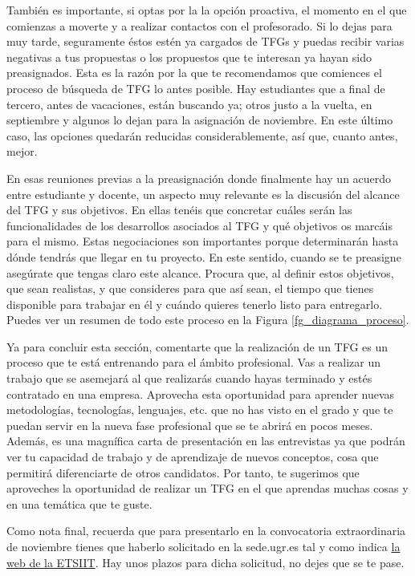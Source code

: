 También es importante, si optas por la la opción proactiva, el momento en el que comienzas a moverte y a realizar contactos con el profesorado. Si lo dejas para muy tarde, seguramente éstos estén ya cargados de TFGs y puedas recibir varias negativas a tus propuestas o los propuestos que te interesan ya hayan sido preasignados. Esta es la razón por la que te recomendamos que comiences el proceso de búsqueda de TFG lo antes posible. Hay estudiantes que a final de tercero, antes de vacaciones, están buscando ya; otros justo a la vuelta, en septiembre y algunos lo dejan para la asignación de noviembre. En este último caso, las opciones quedarán reducidas considerablemente, así que, cuanto antes, mejor.

En esas reuniones previas a la preasignación donde finalmente hay un acuerdo entre estudiante y docente, un aspecto muy relevante es la discusión del alcance del TFG y sus objetivos. En ellas tenéis que concretar cuáles serán las funcionalidades de los desarrollos asociados al TFG y qué objetivos os marcáis para el mismo. Estas negociaciones son importantes porque determinarán hasta dónde tendrás que llegar en tu proyecto. En este sentido, cuando se te preasigne asegúrate que tengas claro este alcance. Procura que, al definir estos objetivos, que sean realistas, y que consideres para que así sean, el tiempo que tienes disponible para trabajar en él y cuándo quieres tenerlo listo para entregarlo. Puedes ver un resumen de todo este proceso en la Figura  \ref{fg_diagrama_proceso}.

Ya para concluir esta sección, comentarte que la realización de un TFG es un proceso que te está entrenando para el ámbito profesional. Vas a realizar un trabajo que se asemejará al que realizarás cuando hayas terminado y estés contratado en una empresa. Aprovecha esta oportunidad para aprender nuevas metodologías, tecnologías, lenguajes, etc. que no has visto en el grado y que te puedan servir en la nueva fase profesional que se te abrirá en pocos meses. Además, es una magnífica carta de presentación en las entrevistas ya que podrán ver tu capacidad de trabajo y de aprendizaje de nuevos conceptos, cosa que permitirá diferenciarte de otros candidatos. Por tanto, te sugerimos que aproveches la oportunidad de realizar un TFG en el que aprendas muchas cosas y en una temática que te guste. 

Como nota final, recuerda que para presentarlo en la convocatoria extraordinaria de noviembre tienes que haberlo solicitado en la sede.ugr.es tal y como indica \href{https://grados.ugr.es/informatica/pages/infoacademica/tfggestion2}{la web de la ETSIIT}. Hay unos plazos para dicha solicitud, no dejes que se te pase.

